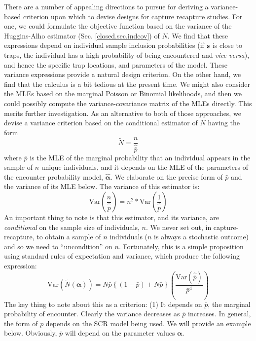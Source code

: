 There are a number of appealing directions to pursue for deriving a
variance-based criterion upon which to devise designs for capture
recapture studies.  For one, we could formulate the objective function
based on the variance of the Huggins-Alho estimator (Sec. \ref{closed.sec.indcov}) of $N$.  
We find that these expressions depend on individual sample inclusion
probabilities (if ${\bf s}$ is close to traps, the individual has a
high probability of being encountered and {\it vice versa}), and hence
the specific trap locations, and parameters of the model.  These
variance expressions provide a natural design criterion. On the other
hand, we find that the calculus is a bit tedious at the present time.
We might also consider the MLEs based on the marginal Poisson or
Binomial likelihoods, and then we could possibly compute the
variance-covariance matrix of the MLEs directly.  This merits further
investigation.  As an alternative to both of those approaches, we
devise a variance criterion based on the conditional estimator of $N$
having the form
\[
  \tilde{N}  =  \frac{n}{\hat{\bar{p}}}
\]
where $\hat{\bar{p}}$ is the MLE of the marginal probability that an
individual appears in the sample of $n$ unique individuals, and it
depends on the MLE of the parameters of the encounter probability
model, $\hat{\bm \alpha}$.  We elaborate on the precise form of
$\bar{p}$ and the variance of its MLE below.  The variance of this
estimator is:
\[
\mbox{Var}(\frac{n}{\hat{\bar{p}}}) = n^2 * \mbox{Var}(
\frac{1}{\hat{\bar{p}}} )
\]
An important thing to note is that this estimator, and its variance, 
are  {\it conditional}
on the sample size of individuals, $n$. We never set out, in capture-recapture, to obtain a sample of
$n$ individuals ($n$ is always a stochastic outcome) and so we need to 
``uncondition'' on $n$.
Fortunately, this is a simple proposition using standard rules of
expectation and variance, which produce the following expression:
\begin{equation}
 \mbox{Var}(\tilde{N}(\bm \alpha) ) =
  N \bar{p} \left\{ (1-\bar{p}) + N \bar{p} \right\}
\left( \frac{ \mbox{Var}( \hat{\bar{p}}) } { \bar{p}^{4} } \right)
\label{design.eq.theQ}
\end{equation}
The key thing to note about this as a criterion:
 (1) It depends on $\bar{p}$, the marginal probability of
 encounter. Clearly the variance decreases as $\bar{p}$ increases. In
 general, the form of $\bar{p}$ depends on the SCR model being used. We
 will provide an example below. Obviously, $\bar{p}$ will depend on
 the parameter values ${\bm \alpha}$. 
